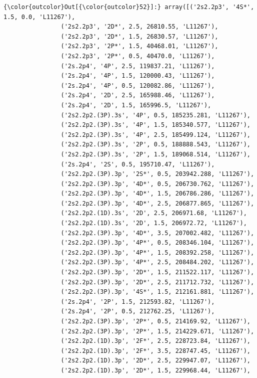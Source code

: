 \documentclass[11pt]{article}
\begin{document}
            \begin{Verbatim}[commandchars=\\\{\}]
{\color{outcolor}Out[{\color{outcolor}52}]:} array([('2s2.2p3', '4S*', 1.5, 0.0, 'L11267'),
                ('2s2.2p3', '2D*', 2.5, 26810.55, 'L11267'),
                ('2s2.2p3', '2D*', 1.5, 26830.57, 'L11267'),
                ('2s2.2p3', '2P*', 1.5, 40468.01, 'L11267'),
                ('2s2.2p3', '2P*', 0.5, 40470.0, 'L11267'),
                ('2s.2p4', '4P', 2.5, 119837.21, 'L11267'),
                ('2s.2p4', '4P', 1.5, 120000.43, 'L11267'),
                ('2s.2p4', '4P', 0.5, 120082.86, 'L11267'),
                ('2s.2p4', '2D', 2.5, 165988.46, 'L11267'),
                ('2s.2p4', '2D', 1.5, 165996.5, 'L11267'),
                ('2s2.2p2.(3P).3s', '4P', 0.5, 185235.281, 'L11267'),
                ('2s2.2p2.(3P).3s', '4P', 1.5, 185340.577, 'L11267'),
                ('2s2.2p2.(3P).3s', '4P', 2.5, 185499.124, 'L11267'),
                ('2s2.2p2.(3P).3s', '2P', 0.5, 188888.543, 'L11267'),
                ('2s2.2p2.(3P).3s', '2P', 1.5, 189068.514, 'L11267'),
                ('2s.2p4', '2S', 0.5, 195710.47, 'L11267'),
                ('2s2.2p2.(3P).3p', '2S*', 0.5, 203942.288, 'L11267'),
                ('2s2.2p2.(3P).3p', '4D*', 0.5, 206730.762, 'L11267'),
                ('2s2.2p2.(3P).3p', '4D*', 1.5, 206786.286, 'L11267'),
                ('2s2.2p2.(3P).3p', '4D*', 2.5, 206877.865, 'L11267'),
                ('2s2.2p2.(1D).3s', '2D', 2.5, 206971.68, 'L11267'),
                ('2s2.2p2.(1D).3s', '2D', 1.5, 206972.72, 'L11267'),
                ('2s2.2p2.(3P).3p', '4D*', 3.5, 207002.482, 'L11267'),
                ('2s2.2p2.(3P).3p', '4P*', 0.5, 208346.104, 'L11267'),
                ('2s2.2p2.(3P).3p', '4P*', 1.5, 208392.258, 'L11267'),
                ('2s2.2p2.(3P).3p', '4P*', 2.5, 208484.202, 'L11267'),
                ('2s2.2p2.(3P).3p', '2D*', 1.5, 211522.117, 'L11267'),
                ('2s2.2p2.(3P).3p', '2D*', 2.5, 211712.732, 'L11267'),
                ('2s2.2p2.(3P).3p', '4S*', 1.5, 212161.881, 'L11267'),
                ('2s.2p4', '2P', 1.5, 212593.82, 'L11267'),
                ('2s.2p4', '2P', 0.5, 212762.25, 'L11267'),
                ('2s2.2p2.(3P).3p', '2P*', 0.5, 214169.92, 'L11267'),
                ('2s2.2p2.(3P).3p', '2P*', 1.5, 214229.671, 'L11267'),
                ('2s2.2p2.(1D).3p', '2F*', 2.5, 228723.84, 'L11267'),
                ('2s2.2p2.(1D).3p', '2F*', 3.5, 228747.45, 'L11267'),
                ('2s2.2p2.(1D).3p', '2D*', 2.5, 229947.07, 'L11267'),
                ('2s2.2p2.(1D).3p', '2D*', 1.5, 229968.44, 'L11267'),

\end{Verbatim}
\end{document}
